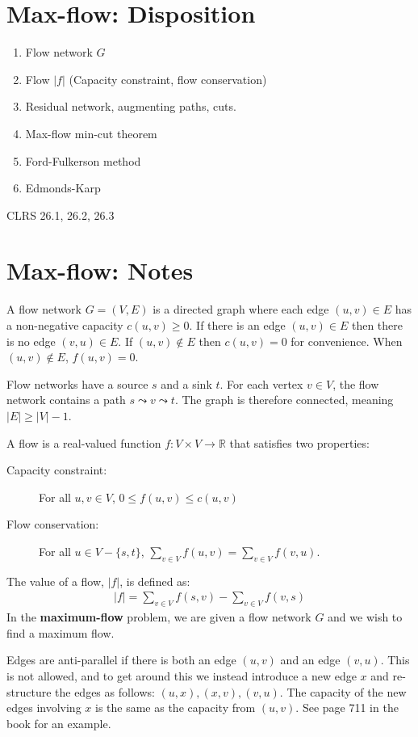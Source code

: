 \section{Max-flow: Disposition}
\begin{enumerate}
	\item Flow network $G$
	\item Flow $|f|$ (Capacity constraint, flow conservation)
	\item Residual network, augmenting paths, cuts.
	\item Max-flow min-cut theorem
	\item Ford-Fulkerson method
	\item Edmonds-Karp
\end{enumerate}

CLRS 26.1, 26.2, 26.3

\section{Max-flow: Notes}
A flow network $G = (V,E)$ is a directed graph where each edge $(u,v) \in E$ has
a non-negative capacity $c(u,v) \geq 0$. If there is an edge $(u,v) \in E$ then
there is no edge $(v,u) \in E$. If $(u,v) \notin E$ then $c(u,v) = 0$ for convenience.
When $(u,v) \notin E$, $f(u,v) = 0$.

Flow networks have a source $s$ and a sink $t$. For each vertex $v \in V$, the flow
network contains a path $s \leadsto v \leadsto t$. The graph is therefore connected, meaning
$|E| \geq |V| - 1$.

A flow is a real-valued function $f : V \times V \rightarrow \mathbb{R}$ that satisfies
two properties:
\begin{description}
	\item[Capacity constraint:] For all $u,v \in V$, $0 \leq f(u,v) \leq c(u,v)$

	\item[Flow conservation:] For all $u \in V - \{s,t\}$, 
	$\sum_{v \in V} f(u,v) = \sum_{v \in V} f(v,u)$.
\end{description}
The value of a flow, $|f|$, is defined as:
\begin{align*}
	|f| = \sum_{v \in V} f(s,v) - \sum_{v \in V} f(v,s)
\end{align*}
In the \textbf{maximum-flow} problem, we are given a flow network $G$ and we wish to find
a maximum flow.

Edges are anti-parallel if there is both an edge $(u,v)$ and an edge $(v,u)$. This is not allowed,
and to get around this we instead introduce a new edge $x$ and re-structure the edges as follows:
$(u,x), (x,v), (v,u)$. The capacity of the new edges involving $x$ is the same as the capacity from
$(u,v)$. See page 711 in the book for an example.

